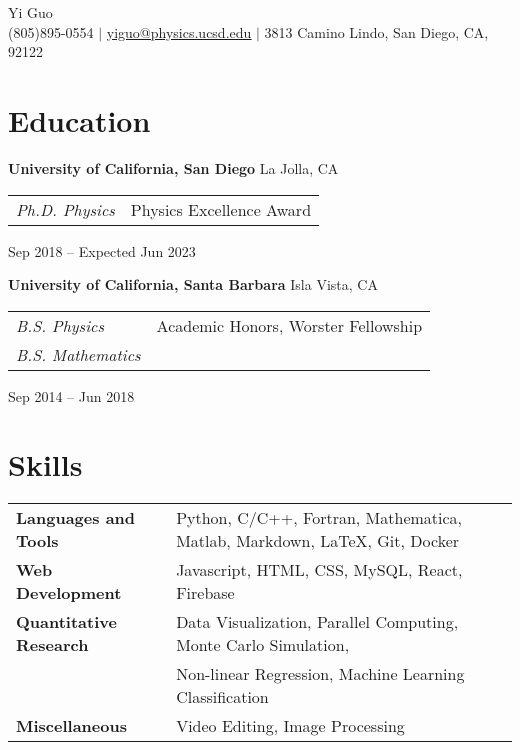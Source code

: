 \documentclass[letterpaper,12pt]{article}
\begin{document}
\newcommand{\name}{Yi Guo}
\newcommand{\phone}{(805)895-0554}
\newcommand{\email}{yiguo@physics.ucsd.edu}
\newcommand{\address}{3813 Camino Lindo, San Diego, CA, 92122}
\newcommand{\github}{y1guo}
\newcommand{\linkedin}{y1guo}
\newcommand{\website}{https://y1guo.github.io}

\begin{center}
    \Huge \name \\
    \vspace{1pt}
    \small \phone 
    $|$ \href{mailto:\email}{\underline{\email}} 
    $|$ \address
    \vspace{-15pt}
\end{center}


\section{Education}

\textbf{University of California, San Diego} \hfill La Jolla, CA \\
\begin{tabular}{p{10em} p{20em}}
\textit{Ph.D. Physics} 
& Physics Excellence Award 
\end{tabular}
\hfill Sep 2018 -- Expected Jun 2023

\textbf{University of California, Santa Barbara} \hfill Isla Vista, CA \\
\begin{tabular}{p{10em} p{20em}}
\textit{B.S. Physics}
& Academic Honors, Worster Fellowship \\
\textit{B.S. Mathematics}
&
\end{tabular}
\hfill Sep 2014 -- Jun 2018


\section{Skills}

\begin{tabular}{p{10em} p{33em}}
    \textbf{Languages and Tools} 
    & Python, C/C++, Fortran, Mathematica, Matlab, Markdown, \LaTeX, Git, Docker \\
    \textbf{Web Development}
    & Javascript, HTML, CSS, MySQL, React, Firebase \\
    \textbf{Quantitative Research} 
    & Data Visualization, Parallel Computing, Monte Carlo Simulation, \\
    & Non-linear Regression, Machine Learning Classification \\
    \textbf{Miscellaneous} 
    & Video Editing, Image Processing
\end{tabular}
\end{document}
